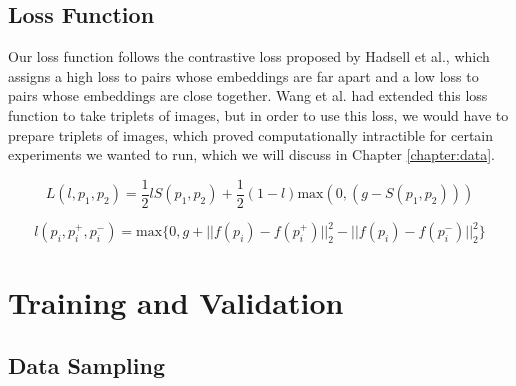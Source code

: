\subsection{Loss Function}
Our loss function follows the contrastive loss proposed by Hadsell et al.\cite{hadsell2006dimensionality}, which assigns a high loss to pairs whose embeddings are far apart and a low loss to pairs whose embeddings are close together. Wang et al.\cite{wang2014learning} had extended this loss function to take triplets of images, but in order to use this loss, we would have to prepare triplets of images, which proved computationally intractible for certain experiments we wanted to run, which we will discuss in Chapter \ref{chapter:data}.

\begin{equation}
L(l, p_1, p_2) = \dfrac{1}{2}lS(p_1, p_2) + \dfrac{1}{2}(1-l)\text{max}(0, (g-S(p_1,p_2)))
\end{equation}

\begin{equation}
l(p_i, p_i^+, p_i^-) = \text{max}\{0, g + ||f(p_i) - f(p_i^+)||_2^2 - ||f(p_i)-f(p_i^-)||_2^2\}
\end{equation}



\section{Training and Validation}

\subsection{Data Sampling}


















